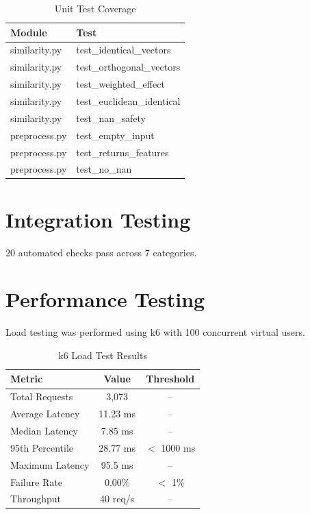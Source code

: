 \begin{table}[htbp]
  \centering
  \caption{Unit Test Coverage}
  \label{tab:unittests}
  \begin{tabular}{@{}ll@{}}
    \toprule
    \textbf{Module} & \textbf{Test} \\
    \midrule
    similarity.py & test\_identical\_vectors \\
    similarity.py & test\_orthogonal\_vectors \\
    similarity.py & test\_weighted\_effect \\
    similarity.py & test\_euclidean\_identical \\
    similarity.py & test\_nan\_safety \\
    preprocess.py & test\_empty\_input \\
    preprocess.py & test\_returns\_features \\
    preprocess.py & test\_no\_nan \\
    \bottomrule
  \end{tabular}
\end{table}

\section{Integration Testing}
20 automated checks pass across 7 categories.

\section{Performance Testing}
Load testing was performed using k6 with 100 concurrent virtual users.

\begin{table}[htbp]
  \centering
  \caption{k6 Load Test Results}
  \label{tab:k6}
  \begin{tabular}{@{}lcc@{}}
    \toprule
    \textbf{Metric} & \textbf{Value} & \textbf{Threshold} \\
    \midrule
    Total Requests       & 3,073     & -- \\
    Average Latency      & 11.23 ms  & -- \\
    Median Latency       & 7.85 ms   & -- \\
    95th Percentile      & 28.77 ms  & $<$ 1000 ms \\
    Maximum Latency      & 95.5 ms   & -- \\
    Failure Rate         & 0.00\%    & $<$ 1\% \\
    Throughput           & 40 req/s  & -- \\
    \bottomrule
  \end{tabular}
\end{table}

